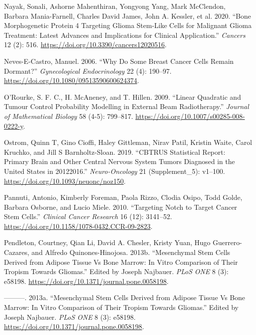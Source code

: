 \documentclass[
  letterpaper,
]{scrreprt}
\newlength{\cslhangindent}
\newenvironment{CSLReferences}[2] %
 {\begin{list}{}{%
  \setlength{\itemindent}{0pt}
  \setlength{\leftmargin}{0pt}
  \setlength{\parsep}{0pt}
  \ifodd #1
   \setlength{\leftmargin}{\cslhangindent}
   \setlength{\itemindent}{-1\cslhangindent}
  \fi
  \setlength{\itemsep}{#2\baselineskip}}}
 {\end{list}}
\theoremstyle{definition}
\theoremstyle{remark}
\begin{document}
\begin{CSLReferences}{1}{0}
Nayak, Sonali, Ashorne Mahenthiran, Yongyong Yang, Mark McClendon,
Barbara Mania-Farnell, Charles David James, John A. Kessler, et al.
2020. {``Bone Morphogenetic Protein 4 Targeting Glioma Stem-Like Cells
for Malignant Glioma Treatment: Latest Advances and Implications for
Clinical Application.''} \emph{Cancers} 12 (2): 516.
\url{https://doi.org/10.3390/cancers12020516}.

Neves-E-Castro, Manuel. 2006. {``Why Do Some Breast Cancer Cells Remain
Dormant?''} \emph{Gynecological Endocrinology} 22 (4): 190--97.
\url{https://doi.org/10.1080/09513590600624374}.

O'Rourke, S. F. C., H. McAneney, and T. Hillen. 2009. {``Linear
Quadratic and Tumour Control Probability Modelling in External Beam
Radiotherapy.''} \emph{Journal of Mathematical Biology} 58 (4-5):
799--817. \url{https://doi.org/10.1007/s00285-008-0222-y}.

Ostrom, Quinn T, Gino Cioffi, Haley Gittleman, Nirav Patil, Kristin
Waite, Carol Kruchko, and Jill S Barnholtz-Sloan. 2019. {``CBTRUS
Statistical Report: Primary Brain and Other Central Nervous System
Tumors Diagnosed in the United States in 2012{\textendash}2016.''}
\emph{Neuro-Oncology} 21 (Supplement{\_}5): v1--100.
\url{https://doi.org/10.1093/neuonc/noz150}.

Pannuti, Antonio, Kimberly Foreman, Paola Rizzo, Clodia Osipo, Todd
Golde, Barbara Osborne, and Lucio Miele. 2010. {``Targeting Notch to
Target Cancer Stem Cells.''} \emph{Clinical Cancer Research} 16 (12):
3141--52. \url{https://doi.org/10.1158/1078-0432.CCR-09-2823}.

Pendleton, Courtney, Qian Li, David A. Chesler, Kristy Yuan, Hugo
Guerrero-Cazares, and Alfredo Quinones-Hinojosa. 2013b. {``Mesenchymal
Stem Cells Derived from Adipose Tissue Vs Bone Marrow: In Vitro
Comparison of Their Tropism Towards Gliomas.''} Edited by Joseph
Najbauer. \emph{PLoS ONE} 8 (3): e58198.
\url{https://doi.org/10.1371/journal.pone.0058198}.

---------. 2013a. {``Mesenchymal Stem Cells Derived from Adipose Tissue
Vs Bone Marrow: In Vitro Comparison of Their Tropism Towards Gliomas.''}
Edited by Joseph Najbauer. \emph{PLoS ONE} 8 (3): e58198.
\url{https://doi.org/10.1371/journal.pone.0058198}.


\end{CSLReferences}
\end{document}
